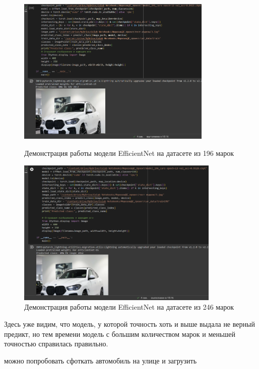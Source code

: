 \documentclass[14pt]{extarticle}
\begin{document}
\begin{figure}[H]
\centering
\begin{minipage}{0.49\textwidth}
  \centering
  \includegraphics[height=7.1cm]{images/16.png}  
  \caption{Демонстрация работы модели \foreignlanguage{english}{EfficientNet} на датасете из 196 марок}
  \label{fig:12}
\end{minipage}
\hfill
\begin{minipage}{0.49\textwidth}
  \centering
  \includegraphics[height=7.1cm]{images/17.png}  
  \caption{Демонстрация работы модели \foreignlanguage{english}{EfficientNet} на датасете из 246 марок}
  \label{fig:13}
\end{minipage}
\end{figure}

Здесь уже видим, что модель, у которой точность хоть и выше выдала не верный предикт, но тем времени модель с большим количеством марок и меньшей точностью справилась правильно.

 можно попробовать сфоткать автомобиль на улице и загрузить
\end{document}
